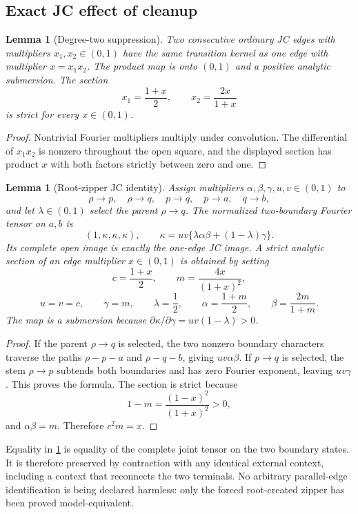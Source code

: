 \documentclass[11pt]{article}
\newtheorem{lemma}[theorem]{Lemma}
\theoremstyle{remark}\newtheorem{remark}[theorem]{Remark}
\begin{document}
\subsection{Exact JC effect of cleanup}
\begin{lemma}[Degree-two suppression]\label{lem:deg2}
Two consecutive ordinary JC edges with multipliers $x_1,x_2\in(0,1)$ have the same transition kernel as one edge with multiplier $x=x_1x_2$.  The product map is onto $(0,1)$ and a positive analytic submersion.  The section
\[
x_1=\frac{1+x}{2},\qquad x_2=\frac{2x}{1+x}
\]
is strict for every $x\in(0,1)$.
\end{lemma}

\begin{proof}
Nontrivial Fourier multipliers multiply under convolution.  The differential of $x_1x_2$ is nonzero throughout the open square, and the displayed section has product $x$ with both factors strictly between zero and one.
\end{proof}

\begin{lemma}[Root-zipper JC identity]\label{lem:JCzipper}
Assign multipliers $\alpha,\beta,\gamma,u,v\in(0,1)$ to
\[
\rho\to p,\quad \rho\to q,\quad p\to q,\quad p\to a,\quad q\to b,
\]
and let $\lambda\in(0,1)$ select the parent $\rho\to q$.  The normalized two-boundary Fourier tensor on $a,b$ is
\[
(1,\kappa,\kappa,\kappa),\qquad
\kappa=uv\{\lambda\alpha\beta+(1-\lambda)\gamma\}.
\]
Its complete open image is exactly the one-edge JC image.  A strict analytic section of an edge multiplier $x\in(0,1)$ is obtained by setting
\[
c=\frac{1+x}{2},\qquad m=\frac{4x}{(1+x)^2},
\]
\[
u=v=c,
\qquad \gamma=m,
\qquad \lambda=\frac12,
\qquad \alpha=\frac{1+m}{2},
\qquad \beta=\frac{2m}{1+m}.
\]
The map is a submersion because $\partial\kappa/\partial\gamma=uv(1-\lambda)>0$.
\end{lemma}

\begin{proof}
If the parent $\rho\to q$ is selected, the two nonzero boundary characters traverse the paths $\rho-p-a$ and $\rho-q-b$, giving $uv\alpha\beta$.  If $p\to q$ is selected, the stem $\rho\to p$ subtends both boundaries and has zero Fourier exponent, leaving $uv\gamma$.  This proves the formula.  The section is strict because
\[
1-m=\frac{(1-x)^2}{(1+x)^2}>0,
\]
and $\alpha\beta=m$.  Therefore $c^2m=x$.
\end{proof}

Equality in \cref{lem:JCzipper} is equality of the complete joint tensor on the two boundary states.  It is therefore preserved by contraction with any identical external context, including a context that reconnects the two terminals.  No arbitrary parallel-edge identification is being declared harmless: only the forced root-created zipper has been proved model-equivalent.
\end{document}
